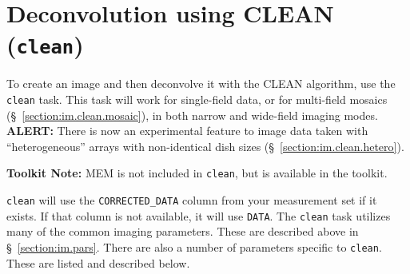 \section{Deconvolution using CLEAN ({\tt clean})}
\label{section:im.clean}

To create an image and then deconvolve it with the CLEAN algorithm,
use the {\tt clean} task.  This task will work for single-field data,
or for multi-field mosaics (\S~\ref{section:im.clean.mosaic}), in both
narrow and wide-field imaging modes.  
{\bf ALERT:} There is now an experimental feature to image data taken with
``heterogeneous'' arrays with non-identical dish sizes 
(\S~\ref{section:im.clean.hetero}).

{\bf Toolkit Note:} MEM is not included in {\tt clean}, but is
available in the toolkit.

{\tt clean} will use the {\tt CORRECTED\_DATA} column from your
measurement set if it exists. If that column is not available, it will
use {\tt DATA}. The {\tt clean} task utilizes many of the common imaging
parameters.  These are described above in \S~\ref{section:im.pars}.
There are also a number of parameters specific to {\tt clean}.  These
are listed and described below.

